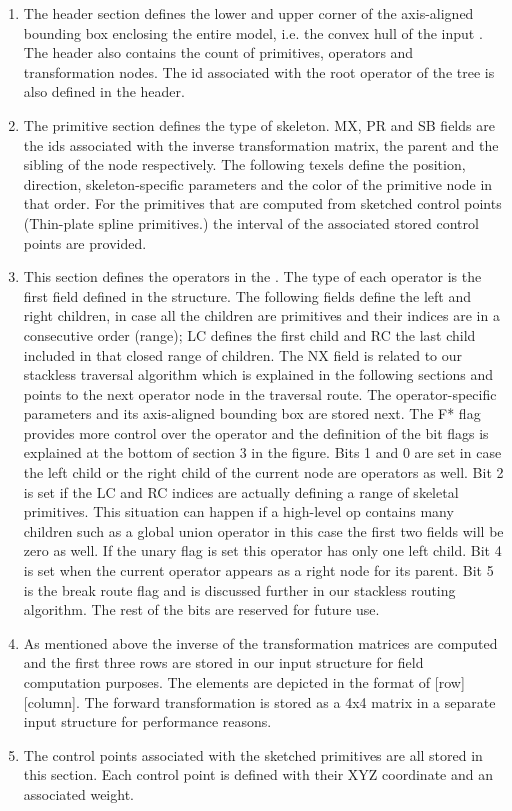\begin{enumerate}
 \item The header section defines the lower and upper corner of the axis-aligned bounding box enclosing the entire model, i.e. the convex hull of the 
 input \blob. The header also contains the count of primitives, operators and transformation nodes. The id associated with the root operator of the 
 tree is also defined in the header.
 \item The primitive section defines the type of skeleton. MX, PR and SB fields are the ids associated with the inverse transformation matrix, the parent and the
 sibling of the node respectively. The following texels define the position, direction, skeleton-specific parameters and the color of the primitive node in 
 that order. For the primitives that are computed from sketched control points (Thin-plate spline \cite{Turk1999, Grasberger} primitives.) the interval of the 
 associated stored control points are provided.

 \item This section defines the operators in the \blob. The type of each operator is the first field defined in the structure. The following fields define the 
 left and right children, in case all the children are primitives and their indices are in a consecutive order (range); LC defines the first child and RC the last child
 included in that closed range of children. The NX field is related to our stackless \blob traversal algorithm which is explained in the following sections and 
 points to the next operator node in the \blob traversal route. The operator-specific parameters and its axis-aligned bounding box are stored next. The F* flag 
 provides more control over the operator and the definition of the bit flags is explained at the bottom of section 3 in the figure. 
 Bits 1 and 0 are set in case the left child or the right child of the current node are operators as well. Bit 2 is set if the LC and RC indices are actually defining 
 a range of skeletal primitives. This situation can happen if a high-level op contains many children such as a global union operator in this case the first two fields
 will be zero as well. If the unary flag is set this operator has only one left child.  Bit 4 is set when the current operator appears as a right node for its parent.
 Bit 5 is the break route flag and is discussed further in our stackless \blob routing algorithm. The rest of the bits are reserved for future use. 
 
 
 \item As mentioned above the inverse of the transformation matrices are computed and the first three rows are stored in our input structure for field computation
 purposes. The elements are depicted in the format of [row][column]. The forward transformation is stored as a 4x4 matrix in a separate input structure for performance
 reasons. 
 
 \item The control points associated with the sketched primitives are all stored in this section. Each control point is defined with their XYZ coordinate and an associated 
 weight. 
\end{enumerate}

